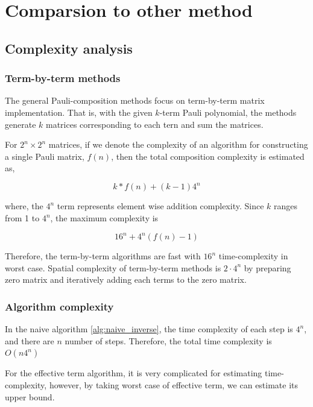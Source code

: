 \documentclass[twocolumn]{article}
\begin{document}
\section{Comparsion to other method}

\subsection{Complexity analysis}

\subsubsection{Term-by-term methods}

The general Pauli-composition methods focus on 
term-by-term matrix implementation. That is, with the given 
$k$-term Pauli polynomial, the methods generate $k$ matrices corresponding to 
each tern and sum the matrices.

For $2^n \times 2^n$ matrices, if we denote the complexity of an algorithm for constructing a single Pauli matrix,
$f(n)$, then the total composition complexity is estimated as,

\begin{equation}
    \label{eq:k-complexity}
    k * f(n) + (k-1) 4^n
\end{equation}

where, the $4^n$ term represents element wise addition complexity.
Since $k$ ranges from 1 to $4^n$, the maximum complexity is

\begin{equation}
    \label{eq:max_complexity}
    16^n + 4^n(f(n)-1)
\end{equation}

Therefore, the term-by-term algorithms are fast with $16^n$ time-complexity in worst case.
Spatial complexity of term-by-term methods is $2 \cdot 4^n$ by preparing 
zero matrix and iteratively adding each terms to the zero matrix.

\subsubsection{Algorithm complexity}

In the naive algorithm \ref{alg:naive_inverse},
the time complexity of each step is $4^n$, and there are $n$ 
number of steps. 
Therefore, the total time complexity is $O(n4^n)$

For the effective term algorithm,
it is very complicated for estimating time-complexity,
however, by taking worst case of effective term, we can estimate its upper bound.
\end{document}
